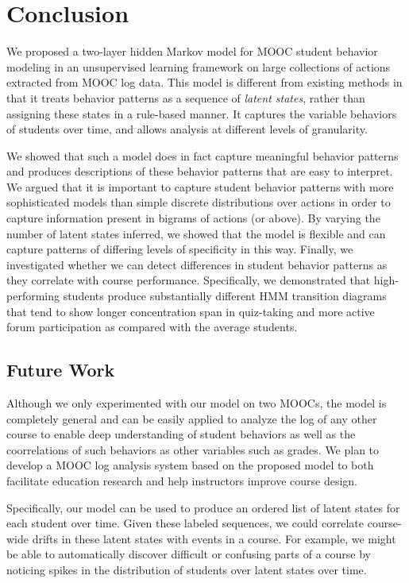 \section{Conclusion}
We proposed a two-layer hidden Markov model for MOOC student behavior
modeling in an unsupervised learning framework on large collections of
actions extracted from MOOC log data. This model is different from existing
methods in that it treats behavior patterns as a sequence of \emph{latent
states}, rather than assigning these states in a rule-based manner. It
captures the variable behaviors of students over time, and allows
analysis at different levels of granularity.

We showed that such a model does in fact capture meaningful behavior
patterns and produces descriptions of these behavior patterns that are easy
to interpret. We argued that it is important to capture student behavior
patterns with more sophisticated models than simple discrete distributions
over actions in order to capture information present in bigrams of actions
(or above). By varying the number of latent
states inferred, we showed that the model is flexible and can capture
patterns of differing levels of specificity in this way.  Finally, we
investigated whether we can detect differences in student behavior patterns
as they correlate with course performance. Specifically, we demonstrated
that high-performing students produce substantially different HMM
transition diagrams that tend to show longer concentration span in quiz-taking
and more active  forum participation as compared with the average students. 

\subsection{Future Work}

Although we only experimented with our model on two MOOCs, the model
is completely general and can be easily applied to analyze the log of any other
course to enable deep understanding of student behaviors as well as the coorrelations
of such behaviors as other variables such as grades. We plan to develop a MOOC log analysis
system based on the proposed model to both facilitate education research and 
help instructors improve course design. 

Specifically, our model can be used to produce an ordered list of latent states for each
student over time. Given these labeled sequences, we could correlate
course-wide drifts in these latent states with events in a course. For
example, we might be able to automatically discover difficult or confusing
parts of a course by noticing spikes in the distribution of students over
latent states over time.

